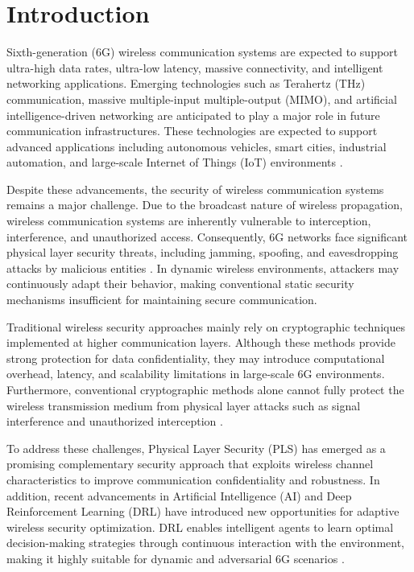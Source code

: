 \documentclass[conference]{IEEEtran}
\begin{document}
\section{Introduction}

Sixth-generation (6G) wireless communication systems are expected to support ultra-high data rates, ultra-low latency, massive connectivity, and intelligent networking applications. Emerging technologies such as Terahertz (THz) communication, massive multiple-input multiple-output (MIMO), and artificial intelligence-driven networking are anticipated to play a major role in future communication infrastructures. These technologies are expected to support advanced applications including autonomous vehicles, smart cities, industrial automation, and large-scale Internet of Things (IoT) environments \cite{b1,b6}.

Despite these advancements, the security of wireless communication systems remains a major challenge. Due to the broadcast nature of wireless propagation, wireless communication systems are inherently vulnerable to interception, interference, and unauthorized access. Consequently, 6G networks face significant physical layer security threats, including jamming, spoofing, and eavesdropping attacks by malicious entities \cite{b1,b4,b6}. In dynamic wireless environments, attackers may continuously adapt their behavior, making conventional static security mechanisms insufficient for maintaining secure communication.

Traditional wireless security approaches mainly rely on cryptographic techniques implemented at higher communication layers. Although these methods provide strong protection for data confidentiality, they may introduce computational overhead, latency, and scalability limitations in large-scale 6G environments. Furthermore, conventional cryptographic methods alone cannot fully protect the wireless transmission medium from physical layer attacks such as signal interference and unauthorized interception \cite{b6}.

To address these challenges, Physical Layer Security (PLS) has emerged as a promising complementary security approach that exploits wireless channel characteristics to improve communication confidentiality and robustness. In addition, recent advancements in Artificial Intelligence (AI) and Deep Reinforcement Learning (DRL) have introduced new opportunities for adaptive wireless security optimization. DRL enables intelligent agents to learn optimal decision-making strategies through continuous interaction with the environment, making it highly suitable for dynamic and adversarial 6G scenarios \cite{b2,b3,b4,b5}.
\end{document}
